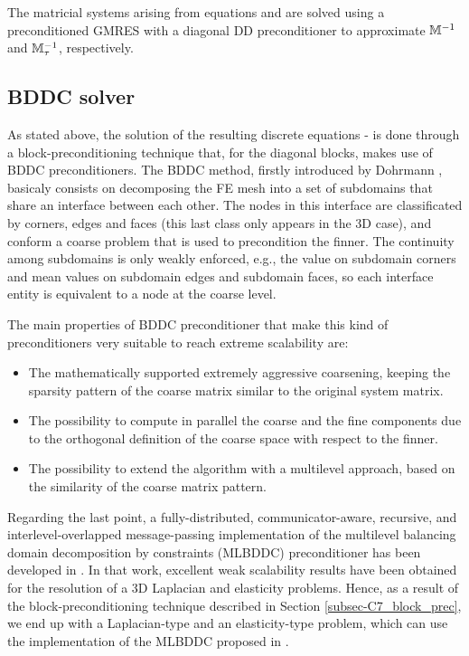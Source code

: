 The matricial systems arising from equations  and  are solved using a preconditioned GMRES with a diagonal DD preconditioner to approximate $ \mathbb{M}^{-1} $ and $ \mathbb{M}_\tau^{-1} $, respectively.

\subsection{BDDC solver}
As stated above, the solution of the resulting discrete equations - is done through a block-preconditioning technique that, for the diagonal blocks, makes use of BDDC preconditioners. The BDDC method, firstly introduced by Dohrmann \cite{dohrmann_preconditioner_2003}, basicaly consists on decomposing the FE mesh into a set of subdomains that share an interface between each other. The nodes in this interface are classificated by corners, edges and faces (this last class only appears in the 3D case), and conform a coarse problem that is used to precondition the finner. The continuity among subdomains is only weakly enforced, e.g., the value on subdomain corners and mean values on subdomain edges and subdomain faces, so each interface entity is equivalent to a node at the coarse level.

The main properties of BDDC preconditioner that make this kind of preconditioners very suitable to reach extreme scalability are: 
\begin{itemize}
\item The mathematically supported extremely aggressive coarsening, keeping the sparsity pattern of the coarse matrix similar to the original system matrix.
\item The possibility to compute in parallel the coarse and the fine components due to the orthogonal definition of the coarse space with respect to the finner.
\item The possibility to extend the algorithm with a multilevel approach, based on the similarity of the coarse matrix pattern.
\end{itemize}

Regarding the last point, a fully-distributed, communicator-aware, recursive, and interlevel-overlapped message-passing implementation of the multilevel balancing domain decomposition by constraints (MLBDDC) preconditioner has been developed in \cite{alberto_f._martin_santiago_badia_and_javier_principe_multilevel_????}. In that work, excellent weak scalability results have been obtained for the resolution of a 3D Laplacian and elasticity problems. Hence, as a result of the block-preconditioning technique described in Section \ref{subsec-C7_block_prec}, we end up with a Laplacian-type and an elasticity-type problem, which can use the implementation of the MLBDDC proposed in \cite{alberto_f._martin_santiago_badia_and_javier_principe_multilevel_????}.

